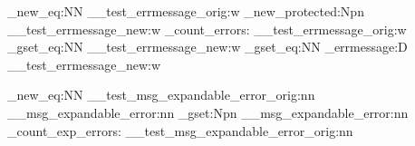 \cs_new_eq:NN \__test_errmessage_orig:w \errmessage
\cs_new_protected:Npn \__test_errmessage_new:w
  {
    \test_count_errors:
    \__test_errmessage_orig:w
  }
\cs_gset_eq:NN \errmessage       \__test_errmessage_new:w
\cs_gset_eq:NN \tex_errmessage:D \__test_errmessage_new:w  %

\cs_new_eq:NN \__test_msg_expandable_error_orig:nn
              \__msg_expandable_error:nn
\cs_gset:Npn \__msg_expandable_error:nn
  {
    \test_count_exp_errors:
    \__test_msg_expandable_error_orig:nn
  }
